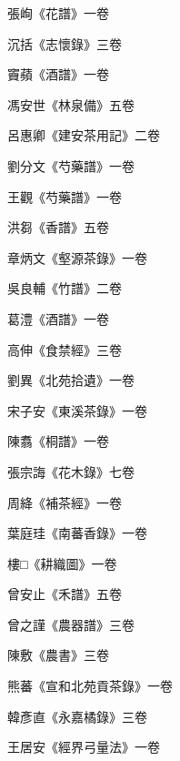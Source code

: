 \begin{pinyinscope}
 張峋《花譜》一卷



 沉括《志懷錄》三卷



 竇蘋《酒譜》一卷



 馮安世《林泉備》五卷



 呂惠卿《建安茶用記》二卷



 劉分文《芍藥譜》一卷



 王觀《芍藥譜》一卷



 洪芻《香譜》五卷



 章炳文《壑源茶錄》一卷



 吳良輔《竹譜》二卷



 葛澧《酒譜》一卷



 高伸《食禁經》三卷



 劉異《北苑拾遺》一卷



 宋子安《東溪茶錄》一卷



 陳翥《桐譜》一卷



 張宗誨《花木錄》七卷



 周絳《補茶經》一卷



 葉庭珪《南蕃香錄》一卷



 樓□《耕織圖》一卷



 曾安止《禾譜》五卷



 曾之謹《農器譜》三卷



 陳敷《農書》三卷



 熊蕃《宣和北苑貢茶錄》一卷



 韓彥直《永嘉橘錄》三卷



 王居安《經界弓量法》一卷




\end{pinyinscope}
